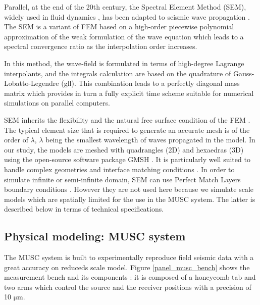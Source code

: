 \documentclass[manuscript,revised]{geophysics}
\begin{document}
\noindent Parallel, at the end of the 20th century, the Spectral Element Method (SEM), widely used in fluid dynamics \citep{Patera_SEM_1984,Korczak_SEM_1986,Karniadakis_FEM_1989}, has been adapted to seismic wave propagation \citep{Komatitsch_SEM_1998,Komatitsch_ISM_1999,Komatitsch_SEM_2005,Festa_PML_2005}. The SEM is a variant of FEM based on a high-order piecewise polynomial approximation of the weak formulation of the wave equation which leads to a spectral convergence ratio as the interpolation order increases. 

\noindent In this method, the wave-field is formulated in terms of high-degree Lagrange interpolants, and the integrals calculation are based on the quadrature of Gauss-Lobatto-Legendre (gll). This combination leads to a perfectly diagonal mass matrix which provides in turn a fully explicit time scheme suitable for numerical simulations on parallel computers.

\noindent SEM inherits the flexibility and the natural free surface condition of the FEM \citep{Tromp_SEM_2008}. The typical element size that is required to generate an accurate mesh is of the order of $\lambda$, $\lambda$ being the smallest wavelength of waves propagated in the model. In our study, the models are meshed with quadrangles (2D) and hexaedras (3D) using the open-source software package GMSH \citep{Geuzaine_MSH_2009}. It is particularly well suited to handle complex geometries and interface matching conditions \citep{Cristini_SEM_2012}. In order to simulate infinite or semi-infinite domain, SEM can use Perfect Match Layers boundary conditions \citep{Berenger_PML_1994,Festa_PML_2005}. However they are not used here because we simulate scale models which are spatially limited for the use in the MUSC system. The latter is described below in terms of technical specifications.


\subsection{Physical modeling: MUSC system}

\noindent The MUSC system \citep{Bretaudeau_SSA_2008b,Bretaudeau_SSM_2011,Bretaudeau_FWI_2013} is built to experimentally reproduce field seismic data with a great accuracy on reduceds scale model. Figure \ref{panel_musc_bench} shows the measurement bench and its components : it is composed of a honeycomb tab and two arms which control the source and the receiver positions with a precision of 10 $\mathrm{\mu m}$.
\end{document}
